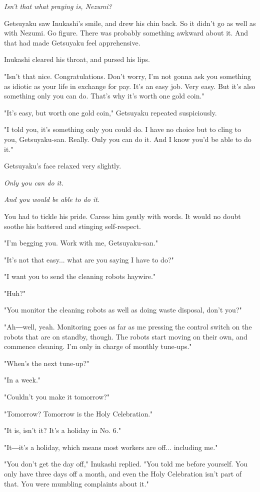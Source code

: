 \emph{Isn't that what praying is, Nezumi?}

Getsuyaku saw Inukashi's smile, and drew his chin back. So it didn't go
as well as with Nezumi. Go figure. There was probably something awkward
about it. And that had made Getsuyaku feel apprehensive.

Inukashi cleared his throat, and pursed his lips.

"Isn't that nice. Congratulations. Don't worry, I'm not gonna ask you
something as idiotic as your life in exchange for pay. It's an easy job.
Very easy. But it's also something only you can do. That's why it's
worth one gold coin."

"It's easy, but worth one gold coin," Getsuyaku repeated suspiciously.

"I told you, it's something only you could do. I have no choice but to
cling to you, Getsuyaku-san. Really. Only you can do it. And I know
you'd be able to do it."

Getsuyaku's face relaxed very slightly.

\emph{Only you can do it.}

\emph{And you \emph{would} be able to do it.}

You had to tickle his pride. Caress him gently with words. It would no
doubt soothe his battered and stinging self-respect.

"I'm begging you. Work with me, Getsuyaku-san."

"It's not that easy... what are you saying I have to do?"

"I want you to send the cleaning robots haywire."

"Huh?"

"You monitor the cleaning robots as well as doing waste disposal, don't
you?"

"Ah―well, yeah. Monitoring goes as far as me pressing the control switch
on the robots that are on standby, though. The robots start moving on
their own, and commence cleaning. I'm only in charge of monthly
tune-ups."

"When's the next tune-up?"

"In a week."

"Couldn't you make it tomorrow?"

"Tomorrow? Tomorrow is the Holy Celebration."

"It is, isn't it? It's a holiday in No. 6."

"It―it's a holiday, which means most workers are off... including me."

"You don't get the day off," Inukashi replied. "You told me before
yourself. You only have three days off a month, and even the Holy
Celebration isn't part of that. You were mumbling complaints about it."

